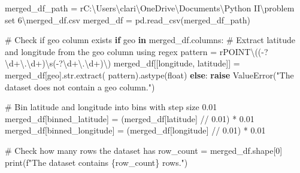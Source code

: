 \documentclass[
  letterpaper,
  DIV=11,
  numbers=noendperiod]{scrartcl}
\newenvironment{Shaded}{\begin{snugshade}}{\end{snugshade}}
\newcommand{\BuiltInTok}[1]{\textcolor[rgb]{0.00,0.23,0.31}{#1}}
\newcommand{\CommentTok}[1]{\textcolor[rgb]{0.37,0.37,0.37}{#1}}
\newcommand{\ControlFlowTok}[1]{\textcolor[rgb]{0.00,0.23,0.31}{\textbf{#1}}}
\newcommand{\DecValTok}[1]{\textcolor[rgb]{0.68,0.00,0.00}{#1}}
\newcommand{\FloatTok}[1]{\textcolor[rgb]{0.68,0.00,0.00}{#1}}
\newcommand{\KeywordTok}[1]{\textcolor[rgb]{0.00,0.23,0.31}{\textbf{#1}}}
\newcommand{\NormalTok}[1]{\textcolor[rgb]{0.00,0.23,0.31}{#1}}
\newcommand{\OperatorTok}[1]{\textcolor[rgb]{0.37,0.37,0.37}{#1}}
\newcommand{\PreprocessorTok}[1]{\textcolor[rgb]{0.68,0.00,0.00}{#1}}
\newcommand{\SpecialCharTok}[1]{\textcolor[rgb]{0.37,0.37,0.37}{#1}}
\newcommand{\SpecialStringTok}[1]{\textcolor[rgb]{0.13,0.47,0.30}{#1}}
\newcommand{\StringTok}[1]{\textcolor[rgb]{0.13,0.47,0.30}{#1}}
\newcommand{\VerbatimStringTok}[1]{\textcolor[rgb]{0.13,0.47,0.30}{#1}}
\begin{document}
\begin{Shaded}
\begin{Highlighting}[]
\NormalTok{merged\_df\_path }\OperatorTok{=} \VerbatimStringTok{r\textquotesingle{}C:\textbackslash{}Users\textbackslash{}clari\textbackslash{}OneDrive\textbackslash{}Documents\textbackslash{}Python II\textbackslash{}problem set 6\textbackslash{}merged\_df.csv\textquotesingle{}}
\NormalTok{merged\_df }\OperatorTok{=}\NormalTok{ pd.read\_csv(merged\_df\_path)}

\CommentTok{\# Check if \textquotesingle{}geo\textquotesingle{} column exists}
\ControlFlowTok{if} \StringTok{\textquotesingle{}geo\textquotesingle{}} \KeywordTok{in}\NormalTok{ merged\_df.columns:}
    \CommentTok{\# Extract latitude and longitude from the \textquotesingle{}geo\textquotesingle{} column using regex}
\NormalTok{    pattern }\OperatorTok{=} \VerbatimStringTok{r\textquotesingle{}POINT\textbackslash{}(({-}?\textbackslash{}d+\textbackslash{}.\textbackslash{}d+)\textbackslash{}s({-}?\textbackslash{}d+\textbackslash{}.\textbackslash{}d+)\textbackslash{})\textquotesingle{}}
\NormalTok{    merged\_df[[}\StringTok{\textquotesingle{}longitude\textquotesingle{}}\NormalTok{, }\StringTok{\textquotesingle{}latitude\textquotesingle{}}\NormalTok{]] }\OperatorTok{=}\NormalTok{ merged\_df[}\StringTok{\textquotesingle{}geo\textquotesingle{}}\NormalTok{].}\BuiltInTok{str}\NormalTok{.extract(}
\NormalTok{        pattern).astype(}\BuiltInTok{float}\NormalTok{)}
\ControlFlowTok{else}\NormalTok{:}
    \ControlFlowTok{raise} \PreprocessorTok{ValueError}\NormalTok{(}\StringTok{"The dataset does not contain a \textquotesingle{}geo\textquotesingle{} column."}\NormalTok{)}
\end{Highlighting}
\end{Shaded}

\begin{Shaded}
\begin{Highlighting}[]
\CommentTok{\# Bin latitude and longitude into bins with step size 0.01}
\NormalTok{merged\_df[}\StringTok{\textquotesingle{}binned\_latitude\textquotesingle{}}\NormalTok{] }\OperatorTok{=}\NormalTok{ (merged\_df[}\StringTok{\textquotesingle{}latitude\textquotesingle{}}\NormalTok{] }\OperatorTok{//} \FloatTok{0.01}\NormalTok{) }\OperatorTok{*} \FloatTok{0.01}
\NormalTok{merged\_df[}\StringTok{\textquotesingle{}binned\_longitude\textquotesingle{}}\NormalTok{] }\OperatorTok{=}\NormalTok{ (merged\_df[}\StringTok{\textquotesingle{}longitude\textquotesingle{}}\NormalTok{] }\OperatorTok{//} \FloatTok{0.01}\NormalTok{) }\OperatorTok{*} \FloatTok{0.01}

\CommentTok{\# Check how many rows the dataset has}
\NormalTok{row\_count }\OperatorTok{=}\NormalTok{ merged\_df.shape[}\DecValTok{0}\NormalTok{]}
\BuiltInTok{print}\NormalTok{(}\SpecialStringTok{f"The dataset contains }\SpecialCharTok{\{}\NormalTok{row\_count}\SpecialCharTok{\}}\SpecialStringTok{ rows."}\NormalTok{)}
\end{Highlighting}
\end{Shaded}
\end{document}
